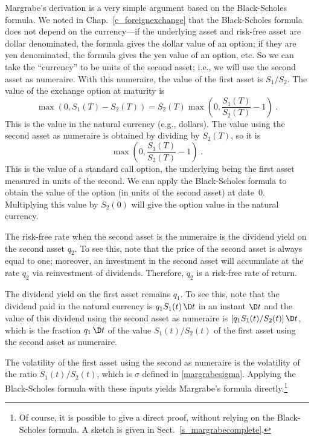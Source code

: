 Margrabe's derivation is a very simple argument based on the Black-Scholes formula.  We noted in Chap.~\ref{c_foreignexchange} that the Black-Scholes formula does not depend on the currency---if the underlying asset and risk-free asset are dollar denominated, the formula gives the dollar value of an option; if they are yen denominated, the formula gives the yen value of an option, etc.  So we can take the ``currency'' to be units of the second asset; i.e., we will use the second asset as numeraire.  With this numeraire, the value of the first asset is $S_1/S_2$.  The value of the exchange option at maturity is
$$\max(0,S_1(T)-S_2(T)) = S_2(T)\max\left(0,\frac{S_1(T)}{S_2(T)}-1\right)\; .$$
This is the value in the natural currency (e.g., dollars).  The value using the second asset as numeraire is obtained by dividing by $S_2(T)$, so it is
$$\max\left(0,\frac{S_1(T)}{S_2(T)}-1\right)\; .$$
This is the value of a standard call option, the underlying being the first asset measured in units of the second.  We can apply the Black-Scholes formula to obtain the  value of the option (in units of the second asset) at date~0.  Multiplying this value by $S_2(0)$ will give the option value in the natural currency.

The risk-free rate when the second asset is the numeraire is the dividend yield on the second asset $q_2$.  To see this, note that the price of the second asset is always equal to one; moreover, an investment in the second asset will accumulate at the rate $q_2$ via reinvestment of dividends.  Therefore, $q_2$ is a risk-free rate of return.

The dividend yield on the first asset remains $q_1$.  To see this, note that the dividend paid in the natural currency is $q_1S_1(t)\,\D t$ in an instant $\D t$ and the value of this dividend using the second asset as numeraire is $[q_1S_1(t)/S_2(t)]\,\D t$, which is the fraction $q_1\,\D t$ of the value $S_1(t)/S_2(t)$ of the first asset using the second asset as numeraire.  

The volatility of the first asset using the second as numeraire is the volatility of the ratio $S_1(t)/S_2(t)$, which is $\sigma$ defined in \eqref{margrabesigma}.  Applying the Black-Scholes formula with these inputs yields Margrabe's formula directly.\footnote{Of course, it is possible to give a direct proof, without relying on the Black-Scholes formula.  A sketch is given in Sect.~\ref{s_margrabecomplete}.} 

